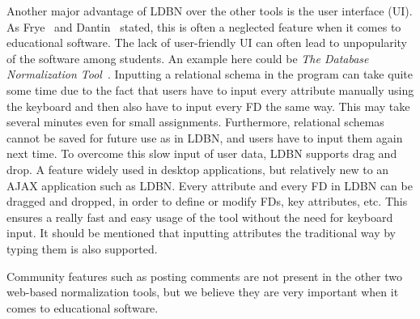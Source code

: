 Another major advantage of LDBN over the other tools is the user interface (UI). 
As Frye~\cite{p12} and Dantin~\cite{p9} stated, this is often a
neglected feature when it comes to educational software. The lack of user-friendly UI 
can often lead to unpopularity of the software among students. An example here could be 
\textit{The Database Normalization Tool}~\cite{w1}. Inputting a relational schema in the program can
take quite some time due to the fact that
users have to input every attribute manually using the keyboard and then also 
have to input every FD the same way. This may take several minutes even for small  
assignments. Furthermore, relational schemas cannot be saved for future use as 
in LDBN, and users have to input them again next time. To overcome this slow input of user data, 
LDBN supports drag and drop. A feature widely used in desktop
applications, but relatively new to an AJAX application such as LDBN. Every attribute
and every FD in LDBN can be dragged and dropped, in order 
to define or modify FDs, key attributes, etc. This ensures a really fast and easy
usage of the tool without the need for keyboard input. It should be mentioned
that inputting attributes the traditional way by typing them is also supported.

Community features such as posting comments are not present in the other two web-based 
normalization tools, but we believe they are very important when it comes to educational
software. 

